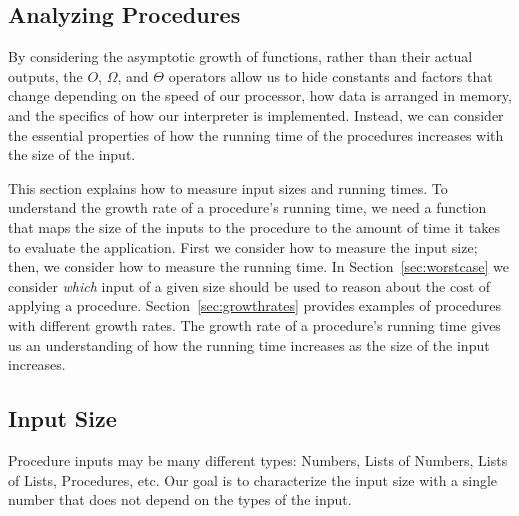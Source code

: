 \begin{schemeregion}

  
\section{Analyzing Procedures}\label{sec:analyzing}

By considering the asymptotic growth of functions, rather than their actual outputs, the $O$, $\Omega$, and $\Theta$ operators allow us to hide constants and factors that change depending on the speed of our processor, how data is arranged in memory, and the specifics of how our interpreter is implemented.  Instead, we can consider the essential properties of how the running time of the procedures increases with the size of the input.

This section explains how to measure input sizes and running times. To understand the growth rate of a procedure's running time, we need a function that maps the size of the inputs to the procedure to the amount of time it takes to evaluate the application.  First we consider how to measure the input size; then, we consider how to measure the running time.  In Section~\ref{sec:worstcase} we consider \emph{which} input of a given size should be used to reason about the cost of applying a procedure.  Section~\ref{sec:growthrates} provides examples of procedures with different growth rates.  The growth rate of a procedure's running time gives us an understanding of how the running time increases as the size of the input increases. 

\subsection{Input Size}\label{sec:inputsize}

Procedure inputs may be many different types: Numbers, Lists of Numbers, Lists of Lists, Procedures, etc.  Our goal is to characterize the input size with a single number that does not depend on the types of the input.


\end{schemeregion}
